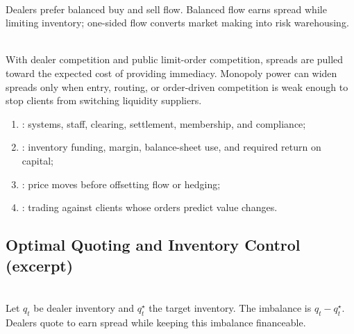 \documentclass[a4paper,oneside,openany]{book}
\begin{document}
\begin{principle} \\
Dealers prefer balanced buy and sell flow. Balanced flow earns spread while limiting inventory; one-sided flow converts market making into risk warehousing.
\end{principle}

\begin{principle} \\
With dealer competition and public limit-order competition, spreads are pulled toward the expected cost of providing immediacy. Monopoly power can widen spreads only when entry, routing, or order-driven competition is weak enough to stop clients from switching liquidity suppliers.
\end{principle}

\begin{taxonomy} 
\begin{enumerate}[label=\roman*.]
\setlength{\itemsep}{0pt}
\item {}: systems, staff, clearing, settlement, membership, and compliance;
\item {}: inventory funding, margin, balance-sheet use, and required return on capital;
\item {}: price moves before offsetting flow or hedging;
\item {}: trading against clients whose orders predict value changes.
\end{enumerate}
\end{taxonomy}

\subsection*{Optimal Quoting and Inventory Control (excerpt)}

\begin{definition} \\
Let $q_t$ be dealer inventory and $q_t^\star$ the target inventory. The imbalance is $q_t-q_t^\star$. Dealers quote to earn spread while keeping this imbalance financeable.
\end{definition}
\end{document}
